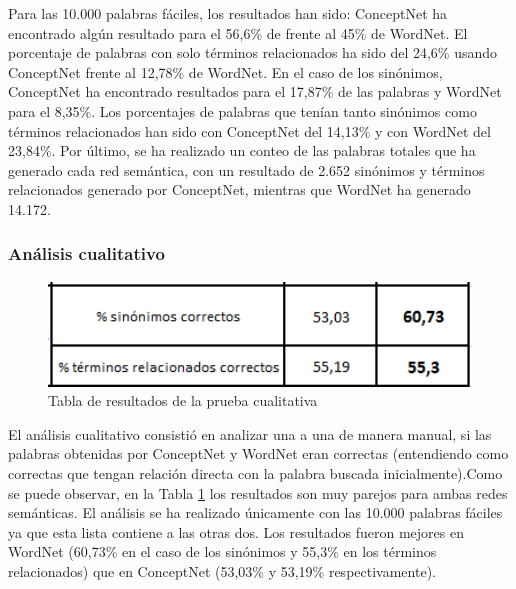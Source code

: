 Para las 10.000 palabras fáciles, los resultados han sido: ConceptNet ha encontrado algún resultado para el 56,6\% de frente al 45\% de WordNet. El porcentaje de palabras con solo términos relacionados ha sido del 24,6\% usando ConceptNet frente al 12,78\% de WordNet. En el caso de los sinónimos, ConceptNet ha encontrado resultados para el 17,87\% de las palabras y WordNet para el 8,35\%. Los porcentajes de palabras que tenían tanto sinónimos como términos relacionados han sido con ConceptNet del 14,13\% y con WordNet del 23,84\%. Por último, se ha realizado un conteo de las palabras totales que ha generado cada red semántica, con un resultado de 2.652 sinónimos y términos relacionados generado por ConceptNet, mientras que WordNet ha generado 14.172.




\subsubsection{Análisis cualitativo}
\label{sssec:pruebaCualitativa}

\begin{figure}[!h]
	\includegraphics[width=1.0\textwidth]{Imagenes/Bitmap/Capitulo4/tabla_cualitativa}
	\caption{Tabla de resultados de la prueba cualitativa}
	\label{fig:tabla_cualitativa}
\end{figure}

El análisis cualitativo consistió en analizar una a una de manera manual, si las palabras obtenidas por ConceptNet y WordNet eran correctas (entendiendo como correctas que tengan relación directa con la palabra buscada inicialmente).Como se puede observar, en la Tabla \ref{fig:tabla_cualitativa} los resultados son muy parejos para ambas redes semánticas. El análisis se ha realizado únicamente con las 10.000 palabras fáciles ya que esta lista contiene a las otras dos. Los resultados fueron mejores en WordNet (60,73\% en el caso de los sinónimos y 55,3\% en los términos relacionados) que en ConceptNet (53,03\% y 53,19\% respectivamente).



